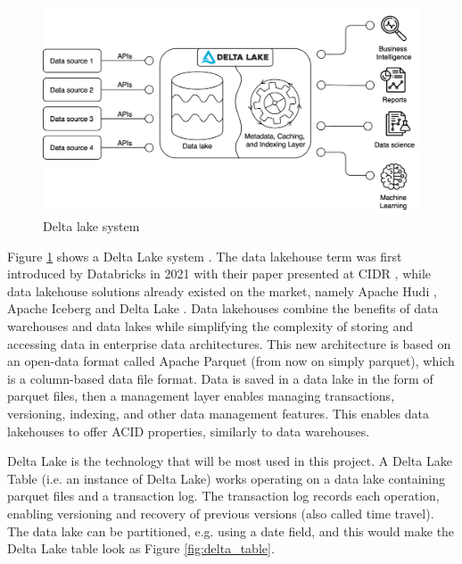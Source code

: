 \begin{figure}[!ht]
    \begin{center}
      \includegraphics[width=\textwidth]{figures/2-background/DeltaLake_evolution-DeltaLake.png}
    \end{center}
    \caption{Delta lake system}
    \label{fig:DeltaLake}
\end{figure}

Figure \ref{fig:DeltaLake} shows a Delta Lake system \cite{armbrustDeltaLakeHighperformance2020}. The data lakehouse term was first introduced by Databricks in 2021 with their paper presented at \gls{CIDR} \cite{lakehouse2021}, while data lakehouse solutions already existed on the market, namely Apache Hudi \cite{rajaperumalUberEngineeringIncremental2017}, Apache Iceberg and Delta Lake \cite{armbrustDeltaLakeHighperformance2020}. Data lakehouses combine the benefits of data warehouses and data lakes while simplifying the complexity of storing and accessing data in enterprise data architectures. This new architecture is based on an open-data format called Apache Parquet (from now on simply parquet), which is a column-based data file format. Data is saved in a data lake in the form of parquet files, then a management layer enables managing transactions, versioning, indexing, and other data management features. This enables data lakehouses to offer \gls{ACID} properties, similarly to data warehouses. 

Delta Lake is the technology that will be most used in this project. A Delta Lake Table (i.e. an instance of Delta Lake) works operating on a data lake containing parquet files and a transaction log. The transaction log records each operation, enabling versioning and recovery of previous versions (also called time travel). The data lake can be partitioned, e.g. using a date field, and this would make the Delta Lake table look as Figure \ref{fig:delta_table}. 

